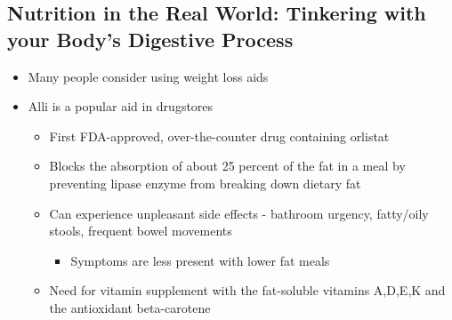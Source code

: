 \documentclass[12pt]{article}
\begin{document}
        \subsection{Nutrition in the Real World: Tinkering with your Body's Digestive Process}
            \begin{itemize}
                \item Many people consider using weight loss aids
                \item Alli is a popular aid in drugstores
                    \begin{itemize}
                        \item First FDA-approved, over-the-counter drug containing orlistat
                        \item Blocks the absorption of about 25 percent of the fat in a meal by preventing lipase enzyme from breaking down dietary fat
                        \item Can experience unpleasant side effects - bathroom urgency, fatty/oily stools, frequent bowel movements
                            \begin{itemize}
                                \item Symptoms are less present with lower fat meals
                            \end{itemize}
                        \item Need for vitamin supplement with the fat-soluble vitamins A,D,E,K and the antioxidant beta-carotene
                    \end{itemize}
            \end{itemize}
\end{document}
